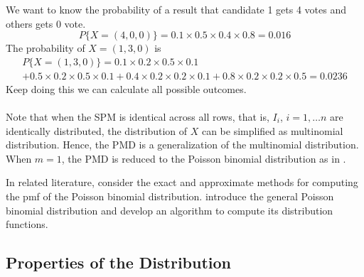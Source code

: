 \documentclass[12pt]{article}
\begin{document}
We want to know the probability of a result that candidate 1 gets 4 votes and others  gets 0 vote.
\begin{equation*}
P\{X = (4,0,0)\} = 0.1\times 0.5 \times 0.4 \times 0.8 = 0.016
\end{equation*}
The probability of $X=(1,3,0)$ is
 \begin{multline*}
 P\{X = (1,3,0)\} = 0.1\times 0.2 \times 0.5 \times 0.1\\ +
 0.5\times0.2\times0.5 \times 0.1 + 0.4\times0.2\times0.2\times0.1 + 0.8\times0.2\times0.2\times0.5 = 0.0236
 \end{multline*}
 Keep doing this we can calculate all possible outcomes.\\
 \\

Note that when the SPM is identical across all rows, that is, $I_{i}$, $i = 1, \dots n$ are identically distributed, the distribution of $X$ can be simplified as multinomial distribution. Hence, the PMD is a generalization of the multinomial distribution. When $m=1$, the PMD is reduced to the Poisson binomial distribution as in .

In related literature,  consider the exact and approximate methods for computing the pmf of the Poisson binomial distribution.  introduce the general Poisson binomial distribution and develop an algorithm to compute its distribution functions.


\subsection{Properties of the Distribution}
\end{document}
